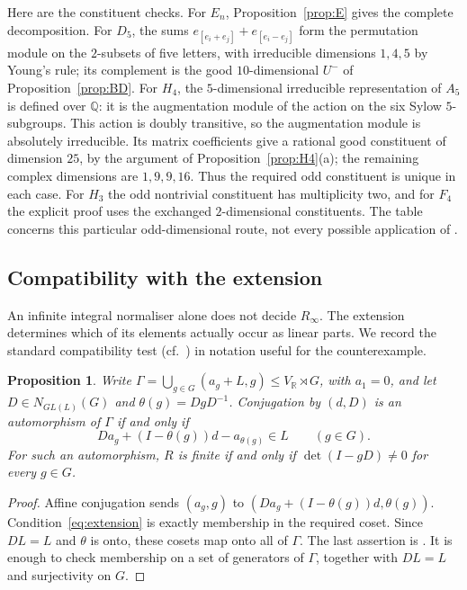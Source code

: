 \documentclass[11pt]{amsart}
\newtheorem{proposition}[theorem]{Proposition}
\theoremstyle{definition}
\newcommand{\Q}{\mathbb{Q}}
\newcommand{\Rinf}{R_\infty}
\begin{document}
Here are the constituent checks. For $E_n$, Proposition~\ref{prop:E} gives the complete decomposition.
For $D_5$, the sums $e_{[e_i+e_j]}+e_{[e_i-e_j]}$ form the permutation module on the $2$-subsets of five
letters, with irreducible dimensions $1,4,5$ by Young's rule; its complement is the good $10$-dimensional
$U^-$ of Proposition~\ref{prop:BD}. For $H_4$, the $5$-dimensional irreducible representation of $A_5$ is
defined over $\Q$: it is the augmentation module of the action on the six Sylow $5$-subgroups.
This action is doubly transitive, so the augmentation module is absolutely irreducible. Its matrix
coefficients give a rational good constituent of dimension $25$, by the argument of
Proposition~\ref{prop:H4}(a); the remaining complex dimensions are $1,9,9,16$.
Thus the required odd constituent is unique in each case. For $H_3$ the odd nontrivial constituent has
multiplicity two, and for $F_4$ the explicit proof uses the exchanged $2$-dimensional constituents.
The table concerns this particular odd-dimensional route, not every possible application of \cite{HL25,HL26}.

\subsection{Compatibility with the extension}

An infinite integral normaliser alone does not decide $\Rinf$. The extension determines which of its
elements actually occur as linear parts. We record the standard compatibility test
(cf.\ \cite[Algorithm~1]{DKT19}) in notation useful for the counterexample.

\begin{proposition}\label{prop:extension}
Write $\Gamma=\bigcup_{g\in G}(a_g+L,g)\le V_\mathbb R\rtimes G$, with $a_1=0$, and let
$D\in N_{GL(L)}(G)$ and $\theta(g)=DgD^{-1}$. Conjugation by $(d,D)$ is an automorphism of $\Gamma$ if and
only if
\begin{equation}\label{eq:extension}
Da_g+(I-\theta(g))d-a_{\theta(g)}\in L\qquad(g\in G).
\end{equation}
For such an automorphism, $R$ is finite if and only if $\det(I-gD)\ne0$ for every $g\in G$.
\end{proposition}
\begin{proof}
Affine conjugation sends $(a_g,g)$ to $(Da_g+(I-\theta(g))d,\theta(g))$.
Condition~\eqref{eq:extension} is exactly membership in the required coset. Since $DL=L$ and $\theta$ is
onto, these cosets map onto all of $\Gamma$. The last assertion is \cite[Thm.~3.3]{DKT19}.
It is enough to check membership on a set of generators of $\Gamma$, together with $DL=L$ and
surjectivity on $G$.
\end{proof}
\end{document}

